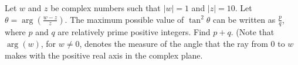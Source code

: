 Let $w$ and $z$ be complex numbers such that $|w| = 1$ and $|z| = 10$. Let $\theta = \arg\left(\tfrac{w-z}{z}\right)$. The maximum possible value of $\tan^2 \theta$ can be written as $\tfrac{p}{q}$,  where $p$ and $q$ are relatively prime positive integers. Find $p+q$. (Note that $\arg(w)$,  for $w \neq 0$,  denotes the measure of the angle that the ray from $0$ to $w$ makes with the positive real axis in the complex plane.